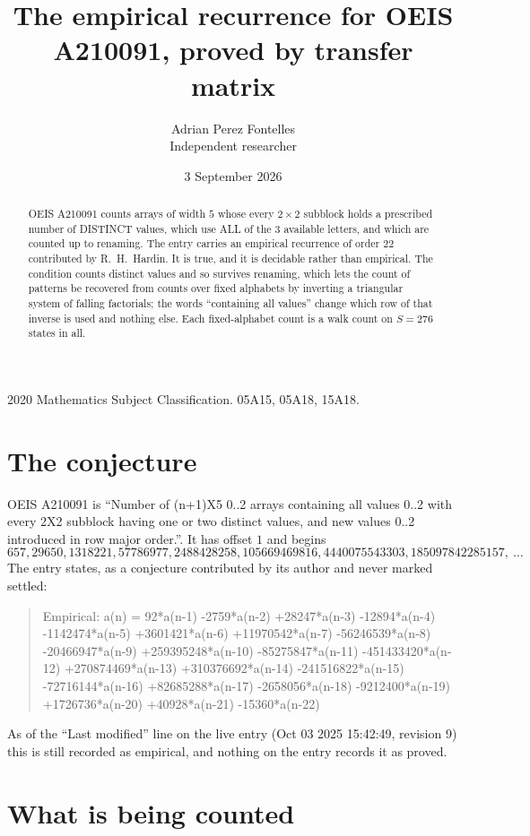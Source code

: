 \documentclass[11pt,a4paper]{article}
\title{The empirical recurrence for OEIS A210091, proved by transfer matrix}
\author{Adrian Perez Fontelles\\ \small Independent researcher}
\date{3 September 2026}
\theoremstyle{plain}
\theoremstyle{definition}
\begin{document}
\maketitle

\begin{abstract}
OEIS A210091 counts arrays of width $5$ whose every $2\times2$ subblock holds a
prescribed number of DISTINCT values, which use ALL of the $3$ available letters, and which
are counted up to renaming. The entry carries an empirical recurrence of order $22$
contributed by R.~H.~Hardin. It is true, and it is decidable rather than empirical. The
condition counts distinct values and so survives renaming, which lets the count of patterns be
recovered from counts over fixed alphabets by inverting a triangular system of falling
factorials; the words ``containing all values'' change which row of that inverse is used and
nothing else. Each fixed-alphabet count is a walk count on $S=276$ states in all.
\end{abstract}

\noindent\small 2020 Mathematics Subject Classification. 05A15, 05A18, 15A18.\normalsize

\section{The conjecture}

OEIS A210091 is ``Number of (n+1)X5 0..2 arrays containing all values 0..2 with every 2X2 subblock having one or two distinct values, and new values 0..2 introduced in row major order.''. It has offset $1$ and begins
\[
657, 29650, 1318221, 57786977, 2488428258, 105669469816, 4440075543303, 185097842285157,\ \dots
\]
The entry states, as a conjecture contributed by its author and never marked settled:
\begin{quote}
Empirical: a(n) = 92*a(n-1) -2759*a(n-2) +28247*a(n-3) -12894*a(n-4) -1142474*a(n-5) +3601421*a(n-6) +11970542*a(n-7) -56246539*a(n-8) -20466947*a(n-9) +259395248*a(n-10) -85275847*a(n-11) -451433420*a(n-12) +270874469*a(n-13) +310376692*a(n-14) -241516822*a(n-15) -72716144*a(n-16) +82685288*a(n-17) -2658056*a(n-18) -9212400*a(n-19) +1726736*a(n-20) +40928*a(n-21) -15360*a(n-22)
\end{quote}
As of the ``Last modified'' line on the live entry (Oct 03 2025 15:42:49, revision 9) this is still
recorded as empirical, and nothing on the entry records it as proved.

\section{What is being counted}
\end{document}

